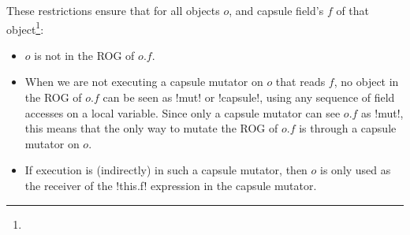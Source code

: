 \noindent These restrictions ensure that for all objects $o$, and capsule field's $f$ of that object\footnote{}:\SS
\begin{itemize}
	\item $o$ is not in the ROG of $o.f$.
\item 
When we are not executing a capsule mutator on $o$ that reads $f$, no object in the ROG of $o.f$ can be seen as \Q!mut! or \Q!capsule!, using any sequence of field accesses on a local variable.
Since only a capsule mutator can see $o.f$ as \Q!mut!, this means that the only way to mutate the ROG of $o.f$ is through a capsule mutator on $o$.
%
	\item If execution is (indirectly) in such a capsule mutator, then $o$ is only used as the receiver of the \Q!this.f! expression in the capsule mutator. %

\end{itemize} 
